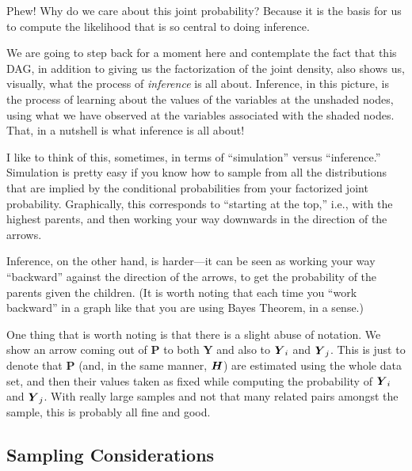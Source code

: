 \documentclass[11pt, oneside]{article}   	%
\def\bm#1{\mathpalette\bmstyle{#1}}
\def\bmstyle#1#2{\mbox{\boldmath$#1#2$}}
\newcommand{\bH}{\bm{H}}
\newcommand{\bY}{\bm{Y}}
\newcommand{\BY}{\mathbf{Y}}
\newcommand{\BP}{\mathbf{P}}
\begin{document}
Phew! Why do we care about this joint probability? Because it is the basis for us to compute the likelihood that is
so central to doing inference.

We are going to step back for a moment here and contemplate the fact that this DAG, in addition to giving us the
factorization of the joint density, also shows us, visually, what the process of {\em inference} is all about.
Inference, in this picture, is the process of learning about the values of the variables at the unshaded nodes, using
what we have observed at the variables associated with the shaded nodes.  That, in a nutshell is what inference
is all about!

I like to think of this, sometimes, in terms of ``simulation'' versus ``inference.''  Simulation is pretty easy if you know how to sample
from all the distributions that are implied by the conditional probabilities from your factorized joint probability.  Graphically,
this corresponds to ``starting at the top,'' i.e., with the highest parents, and then working your way downwards in the direction
of the arrows.  

Inference, on the other hand, is harder---it can be seen as working your way ``backward'' against the direction of the arrows,
to get the probability of the parents given the children.
(It is worth noting that each time you ``work backward'' in a graph like that you are using Bayes Theorem, in a sense.)

One thing that is worth noting is that there is a slight abuse of notation.  We show an arrow coming out of $\BP$ to both $\BY$ and
also to $\bY_i$ and $\bY_j$.  This is just to denote that $\BP$ (and, in the same manner, $\bH$) are estimated using the whole
data set, and then their values taken as fixed while computing the probability of $\bY_i$ and $\bY_j$.  With really large samples
and not that many related pairs amongst the sample, this is probably all fine and good.


\subsection{Sampling Considerations}
\end{document}
